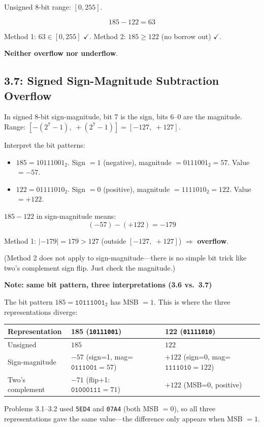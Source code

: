 \medskip
Unsigned 8-bit range: $[0, 255]$.

\[ 185 - 122 = 63 \]

Method 1: $63 \in [0, 255]$ $\checkmark$.
Method 2: $185 \ge 122$ (no borrow out) $\checkmark$.

\textbf{Neither overflow nor underflow}.

\subsection*{3.7: Signed Sign-Magnitude Subtraction Overflow}
\hypertarget{sol-3.7}{}

In signed 8-bit sign-magnitude, bit 7 is the sign, bits 6--0 are the magnitude.
Range: $[-(2^7-1),\; +(2^7-1)] = [-127,\; +127]$.

Interpret the bit patterns:
\begin{itemize}
  \item $185 = 10111001_2$. Sign $= 1$ (negative), magnitude $= 0111001_2 = 57$.
        Value $= -57$.
  \item $122 = 01111010_2$. Sign $= 0$ (positive), magnitude $= 1111010_2 = 122$.
        Value $= +122$.
\end{itemize}

$185 - 122$ in sign-magnitude means:
\[ (-57) - (+122) = -179 \]

Method 1: $|-179| = 179 > 127$ (outside $[-127,\;+127]$) $\Rightarrow$
\textbf{overflow}.

(Method 2 does not apply to sign-magnitude---there is no simple bit trick
like two's complement sign flip. Just check the magnitude.)

\begin{flushright}
\begin{minipage}{0.92\linewidth}
\scriptsize
\textbf{Note: same bit pattern, three interpretations (3.6 vs.\ 3.7)}\par\smallskip
The bit pattern $185 = \texttt{10111001}_2$ has MSB $= 1$.
This is where the three representations diverge:

\smallskip
\begin{tabular}{@{}l l l@{}}
\toprule
Representation & 185 (\texttt{10111001}) & 122 (\texttt{01111010}) \\
\midrule
Unsigned & $185$ & $122$ \\
Sign-magnitude & $-57$ \;(sign=1, mag=$\texttt{0111001}=57$)
               & $+122$ \;(sign=0, mag=$\texttt{1111010}=122$) \\
Two's complement & $-71$ \;(flip+1: $\texttt{01000111}=71$)
                 & $+122$ \;(MSB=0, positive) \\
\bottomrule
\end{tabular}

\smallskip
Problems 3.1--3.2 used \texttt{5ED4} and \texttt{07A4} (both MSB $= 0$),
so all three representations gave the same value---the difference only
appears when MSB $= 1$.
\end{minipage}
\end{flushright}

